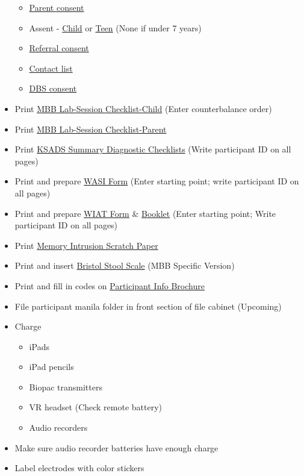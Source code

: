 \documentclass[]{book}
\providecommand{\tightlist}{%
  \setlength{\itemsep}{0pt}\setlength{\parskip}{0pt}}
\begin{document}
\begin{itemize}
  \begin{itemize}
  \tightlist
  \item
    \href{https://app.box.com/file/630320519707}{Parent consent}
  \item
    Assent - \href{https://app.box.com/file/630320502379}{Child} or \href{https://app.box.com/file/630326888191}{Teen} (None if under 7 years)
  \item
    \href{https://app.box.com/file/630329099729}{Referral consent}
  \item
    \href{https://app.box.com/file/639652767665}{Contact list}
  \item
    \href{https://app.box.com/file/630326424318}{DBS consent}
  \end{itemize}
\item
  Print \href{https://app.box.com/file/630326484181}{MBB Lab-Session Checklist-Child} (Enter counterbalance order)
\item
  Print \href{https://app.box.com/file/630325295018}{MBB Lab-Session Checklist-Parent}
\item
  Print \href{https://app.box.com/file/630326477910}{KSADS Summary Diagnostic Checklists} (Write participant ID on all pages)
\item
  Print and prepare \href{https://app.box.com/file/630326463909}{WASI Form} (Enter starting point; write participant ID on all pages)
\item
  Print and prepare \href{https://app.box.com/file/630318060264}{WIAT Form} \& \href{https://app.box.com/file/630326404817}{Booklet} (Enter starting point; Write participant ID on all pages)
\item
  Print \href{https://app.box.com/file/630322810250}{Memory Intrusion Scratch Paper}
\item
  Print and insert \href{https://app.box.com/file/630326499609}{Bristol Stool Scale} (MBB Specific Version)
\item
  Print and fill in codes on \href{https://app.box.com/file/630317204624}{Participant Info Brochure}
\item
  File participant manila folder in front section of file cabinet (Upcoming)
\item
  Charge

  \begin{itemize}
  \tightlist
  \item
    iPads
  \item
    iPad pencils
  \item
    Biopac transmitters
  \item
    VR headset (Check remote battery)
  \item
    Audio recorders
  \end{itemize}
\item
  Make sure audio recorder batteries have enough charge
\item
  Label electrodes with color stickers


\end{itemize}
\end{document}
